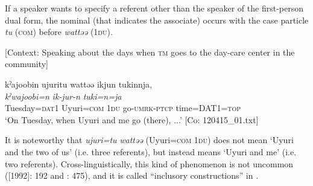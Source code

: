 If a speaker wants to specify a referent other than the speaker of the first-person dual form, the nominal (that indicates the associate) occurs with the case particle \textit{tu} (\textsc{com}) before \textit{wattəə} (1\textsc{du}).

\ea \label{ex:5:4}   [Context: Speaking about the days when \textsc{tm} goes to the day-care center in the community]

\glll  kˀajoobin  ujuritu  wattəə  ikjun  tukinnja,\\
\textit{kˀwajoobi}\footnotemark\textit{=n}  \textit{}  \textit{}  \textit{ik-jur-n}  \textit{tuki=n=ja}\\
Tuesday=\textsc{dat}1  Uyuri=\textsc{com}  1\textsc{du}  go-\textsc{umrk}-\textsc{ptcp}  time=DAT1=\textsc{top}\\
\glt ‘On Tuesday, when Uyuri and me go (there), ...’ [Co: 120415\_01.txt]
\z
{}

\noindent It is noteworthy that \textit{ujuri=tu} \textit{wattəə} (Uyuri=\textsc{com} 1\textsc{du}) does not mean ‘Uyuri and the two of us’ (i.e. three referents), but instead means ‘Uyuri and me’ (i.e. two referents). Cross-linguistically, this kind of phenomenon is not uncommon (\citealt{Jespersen1924}[1992]: 192 and \citealt{Moravcsik2003}: 475), and it is called “inclusory constructions” in \citet{Lichtenberk2000}.

